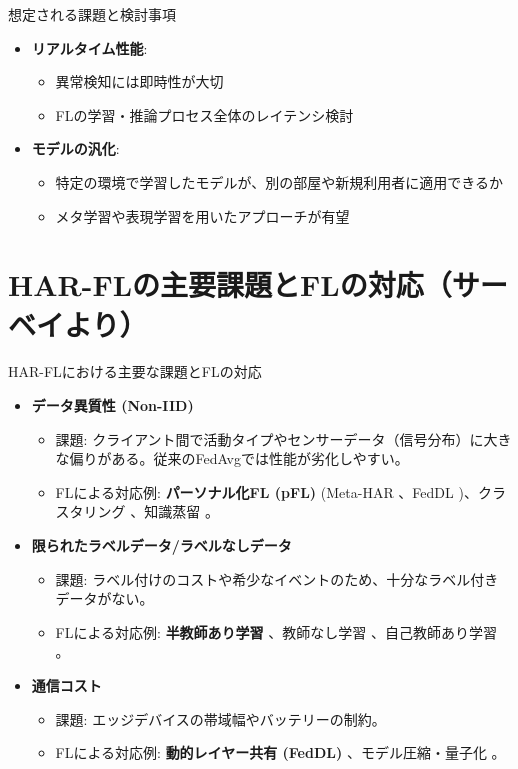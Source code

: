 \documentclass[unicode,12pt,aspectratio=169,dvipdfmx]{beamer}
\begin{document}
\begin{frame}{想定される課題と検討事項}
    \begin{itemize}
        \item \textbf{リアルタイム性能}:
        \begin{itemize}
            \item 異常検知には即時性が大切
            \item FLの学習・推論プロセス全体のレイテンシ検討
        \end{itemize}
        \item \textbf{モデルの汎化}:
        \begin{itemize}
            \item 特定の環境で学習したモデルが、別の部屋や新規利用者に適用できるか
            \item メタ学習や表現学習を用いたアプローチが有望
        \end{itemize}
    \end{itemize}
\end{frame}



\section{HAR-FLの主要課題とFLの対応（サーベイより）}
\begin{frame}{HAR-FLにおける主要な課題とFLの対応}
    \begin{itemize}
        \item \textbf{データ異質性 (Non-IID)}
        \begin{itemize}
            \item 課題: クライアント間で活動タイプやセンサーデータ（信号分布）に大きな偏りがある。従来のFedAvgでは性能が劣化しやすい。
            \item FLによる対応例: \textbf{パーソナル化FL (pFL)} (Meta-HAR 、FedDL )、クラスタリング 、知識蒸留 。
        \end{itemize}
        \item \textbf{限られたラベルデータ/ラベルなしデータ}
        \begin{itemize}
            \item 課題: ラベル付けのコストや希少なイベントのため、十分なラベル付きデータがない。
            \item FLによる対応例: \textbf{半教師あり学習} 、教師なし学習 、自己教師あり学習 。
        \end{itemize}
        \item \textbf{通信コスト}
        \begin{itemize}
            \item 課題: エッジデバイスの帯域幅やバッテリーの制約。
            \item FLによる対応例: \textbf{動的レイヤー共有 (FedDL)} 、モデル圧縮・量子化 。
        \end{itemize}
    \end{itemize}
\end{frame}
\end{document}
